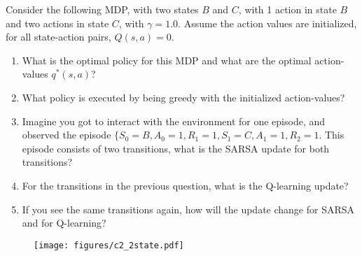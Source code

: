 Consider the following MDP, with two states $B$ and $C$, with 1 action in state $B$ and two actions in state $C$, with $\gamma = 1.0$.
Assume the action values are initialized, for all state-action pairs, $Q(s,a) = 0$.
\begin{enumerate}
\item What is the optimal policy for this MDP and what are the optimal action-values $q^{*}(s,a)$?
\item What policy is executed by being greedy with the initialized action-values?
\item Imagine you got to interact with the environment for one episode, and observed the episode $\{S_0 = B, A_0 = 1, R_1 = 1, S_1 = C, A_1 = 1, R_2 = 1$. This episode consists of two transitions, what is the SARSA update for both transitions?
\item For the transitions in the previous question, what is the Q-learning update?
\item If you see the same transitions again, how will the update change for SARSA and for Q-learning?
\end{enumerate}
\begin{figure}[h!]
  \center
\texttt{[image: figures/c2\_2state.pdf]}
\end{figure}


